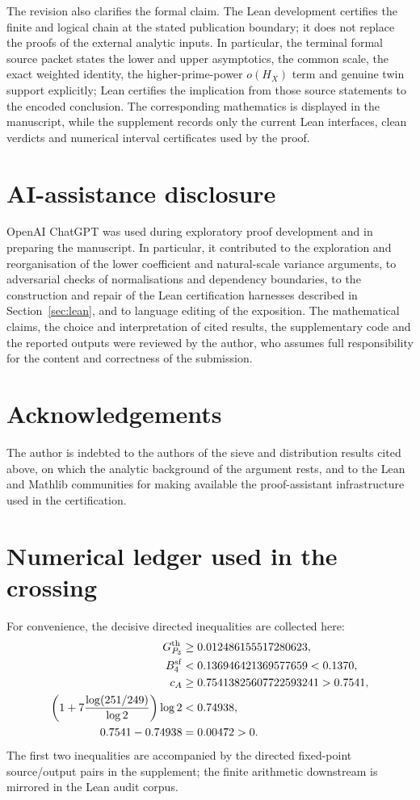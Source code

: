 \documentclass{aomart}
\theoremstyle{definition}
\newcommand{\1}{\mathbf 1}
\begin{document}
The revision also clarifies the formal claim.  The Lean development certifies the finite and logical chain at the stated publication boundary; it does not replace the proofs of the external analytic inputs.  In particular, the terminal formal source packet states the lower and upper asymptotics, the common scale, the exact weighted identity, the higher-prime-power $o(H_X)$ term and genuine twin support explicitly; Lean certifies the implication from those source statements to the encoded conclusion.  The corresponding mathematics is displayed in the manuscript, while the supplement records only the current Lean interfaces, clean verdicts and numerical interval certificates used by the proof.

\section*{AI-assistance disclosure}
OpenAI ChatGPT was used during exploratory proof development and in preparing the manuscript.  In particular, it contributed to the exploration and reorganisation of the lower coefficient and natural-scale variance arguments, to adversarial checks of normalisations and dependency boundaries, to the construction and repair of the Lean certification harnesses described in Section~\ref{sec:lean}, and to language editing of the exposition.  The mathematical claims, the choice and interpretation of cited results, the supplementary code and the reported outputs were reviewed by the author, who assumes full responsibility for the content and correctness of the submission.

\section*{Acknowledgements}
The author is indebted to the authors of the sieve and distribution results cited above, on which the analytic background of the argument rests, and to the Lean and Mathlib communities for making available the proof-assistant infrastructure used in the certification.

\appendix

\section{Numerical ledger used in the crossing}
For convenience, the decisive directed inequalities are collected here:
\begin{align*}
 G_{P_3}^{\rm th}&\ge0.012486155517280623,\\
 B_4^{\rm sf}&<0.136946421369577659<0.1370,\\
 c_A&\ge0.75413825607722593241>0.7541,\\
 \left(1+7\frac{\log(251/249)}{\log2}\right)\log2
 &<0.74938,\\
 0.7541-0.74938&=0.00472>0.
\end{align*}
The first two inequalities are accompanied by the directed fixed-point source/output pairs in the supplement; the finite arithmetic downstream is mirrored in the Lean audit corpus.
\end{document}
